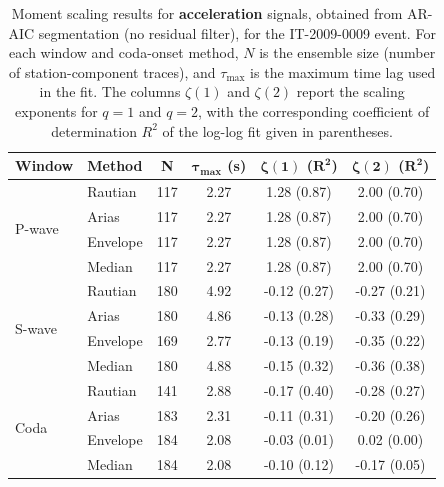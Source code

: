 \begin{table}[H]
\centering
\small
\begin{tabular}{llcccc}
\toprule
\textbf{Window} & \textbf{Method} & \textbf{N} & $\bm{\tau_{\max}}$ \textbf{(s)} & $\bm{\zeta(1)}$ \textbf{(}$\bm{R^2}$\textbf{)} & $\bm{\zeta(2)}$ \textbf{(}$\bm{R^2}$\textbf{)} \\
\midrule
\multirow{4}{*}{P-wave}
& Rautian & 117 & 2.27 & 1.28 (0.87) & 2.00 (0.70) \\
& Arias & 117 & 2.27 & 1.28 (0.87) & 2.00 (0.70) \\
& Envelope & 117 & 2.27 & 1.28 (0.87) & 2.00 (0.70) \\
& Median & 117 & 2.27 & 1.28 (0.87) & 2.00 (0.70) \\
\midrule
\multirow{4}{*}{S-wave}
& Rautian & 180 & 4.92 & -0.12 (0.27) & -0.27 (0.21) \\
& Arias & 180 & 4.86 & -0.13 (0.28) & -0.33 (0.29) \\
& Envelope & 169 & 2.77 & -0.13 (0.19) & -0.35 (0.22) \\
& Median & 180 & 4.88 & -0.15 (0.32) & -0.36 (0.38) \\
\midrule
\multirow{4}{*}{Coda}
& Rautian & 141 & 2.88 & -0.17 (0.40) & -0.28 (0.27) \\
& Arias & 183 & 2.31 & -0.11 (0.31) & -0.20 (0.26) \\
& Envelope & 184 & 2.08 & -0.03 (0.01) & 0.02 (0.00) \\
& Median & 184 & 2.08 & -0.10 (0.12) & -0.17 (0.05) \\
\bottomrule
\end{tabular}
\caption{Moment scaling results for \textbf{acceleration} signals, obtained from AR-AIC segmentation (no residual filter), for the IT-2009-0009 event. For each window and coda-onset method, $N$ is the ensemble size (number of station-component traces), and $\tau_{\max}$ is the maximum time lag used in the fit. The columns $\zeta(1)$ and $\zeta(2)$ report the scaling exponents for $q=1$ and $q=2$, with the corresponding coefficient of determination $R^2$ of the log-log fit given in parentheses.}
\label{tab:ar_aic_scaling_acc_nothresh_laquila}
\end{table}